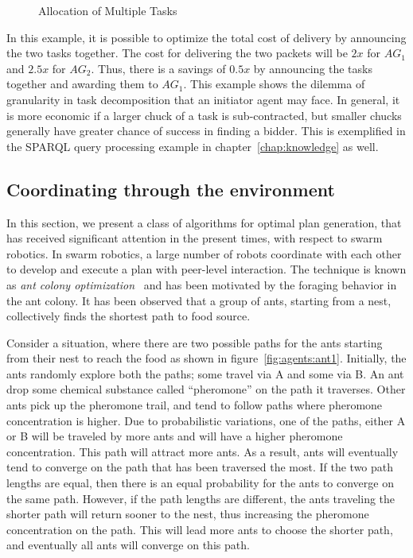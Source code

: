 \begin{figure} [!htbp]
	\centering
	\caption{Allocation of Multiple Tasks}
	\label{fig:agents:multi-task}
\end{figure}

In this example, it is possible to optimize the total cost of delivery by announcing the two tasks together. The cost for delivering
the two packets will be $2x$ for $AG_1$ and $2.5x$ for $AG_2$. Thus, there is a savings of $0.5x$ by announcing the tasks together
and awarding them to $AG_1$. This example shows the dilemma of granularity in task decomposition that an initiator agent may face. 
In general, it is more economic if a larger chuck of a task is sub-contracted, but smaller chucks generally have greater chance of
success in finding a bidder. This is exemplified in the SPARQL query processing example in chapter~\ref{chap:knowledge} as well.

\subsection{Coordinating through the environment}
\label{sec:agents:aco}

In this section, we present a class of algorithms for optimal plan generation, that has received significant attention in the
present times, with respect to swarm robotics. In swarm robotics, a large number of robots coordinate with each other to develop 
and execute a plan with peer-level interaction. The technique is known as {\em ant colony optimization}~\citep{Dorigo:2006} and 
has been motivated by the foraging behavior in the ant colony. It has been observed that a group of ants, starting from a nest, 
collectively finds the shortest path to food source.

 
Consider a situation, where there are two possible paths for the ants starting from their nest to reach the food as shown in 
figure~\ref{fig:agents:ant1}. Initially, the ants randomly explore both the paths; some travel via A and some via B. An ant 
drop some chemical substance called ``pheromone'' on the path it traverses. Other ants pick up the pheromone trail, and tend to  
follow paths where pheromone concentration is higher. Due to probabilistic variations, one of the paths, either A or B will 
be traveled by more ants and will have a higher pheromone concentration. This path will attract more ants. As a result, ants will 
eventually tend to converge on the path that has been traversed the most. If the two path lengths are equal, then there is an equal
probability for the ants to converge on the same path. However, if the path lengths are different, the ants traveling the shorter
path will return sooner to the nest, thus increasing the pheromone concentration on the path. This will lead more ants to choose
the shorter path, and eventually all ants will converge on this path.

